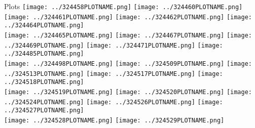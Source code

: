 \begin{frame}\tiny
        \begin{block}{Plots}
		  \centering
                \texttt{[image: ../324458PLOTNAME.png]}
                \texttt{[image: ../324460PLOTNAME.png]}
                \texttt{[image: ../324461PLOTNAME.png]}
                \texttt{[image: ../324462PLOTNAME.png]}
                \texttt{[image: ../324464PLOTNAME.png]}\\
                \texttt{[image: ../324465PLOTNAME.png]}
                \texttt{[image: ../324467PLOTNAME.png]}
                \texttt{[image: ../324469PLOTNAME.png]}
                \texttt{[image: ../324471PLOTNAME.png]}
                \texttt{[image: ../324485PLOTNAME.png]}\\
                \texttt{[image: ../324498PLOTNAME.png]}
                \texttt{[image: ../324509PLOTNAME.png]}
                \texttt{[image: ../324513PLOTNAME.png]}
                \texttt{[image: ../324517PLOTNAME.png]}
                \texttt{[image: ../324518PLOTNAME.png]}\\
                \texttt{[image: ../324519PLOTNAME.png]}
                \texttt{[image: ../324520PLOTNAME.png]}
                \texttt{[image: ../324524PLOTNAME.png]}
                \texttt{[image: ../324526PLOTNAME.png]}
                \texttt{[image: ../324527PLOTNAME.png]}\\
                \texttt{[image: ../324528PLOTNAME.png]}
                \texttt{[image: ../324529PLOTNAME.png]}

\end{block}
\end{frame}
